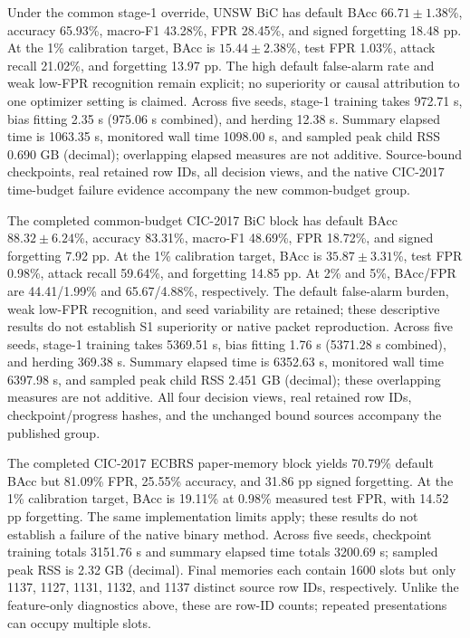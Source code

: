\documentclass[10pt,twocolumn]{article}
\begin{document}
Under the common stage-1 override, UNSW BiC has default BAcc $66.71\pm1.38$\%, accuracy 65.93\%, macro-F1 43.28\%, FPR 28.45\%, and signed forgetting 18.48 pp. At the 1\% calibration target, BAcc is $15.44\pm2.38$\%, test FPR 1.03\%, attack recall 21.02\%, and forgetting 13.97 pp. The high default false-alarm rate and weak low-FPR recognition remain explicit; no superiority or causal attribution to one optimizer setting is claimed. Across five seeds, stage-1 training takes 972.71 s, bias fitting 2.35 s (975.06 s combined), and herding 12.38 s. Summary elapsed time is 1063.35 s, monitored wall time 1098.00 s, and sampled peak child RSS 0.690 GB (decimal); overlapping elapsed measures are not additive. Source-bound checkpoints, real retained row IDs, all decision views, and the native CIC-2017 time-budget failure evidence accompany the new common-budget group.

The completed common-budget CIC-2017 BiC block has default BAcc $88.32\pm6.24$\%, accuracy 83.31\%, macro-F1 48.69\%, FPR 18.72\%, and signed forgetting 7.92 pp. At the 1\% calibration target, BAcc is $35.87\pm3.31$\%, test FPR 0.98\%, attack recall 59.64\%, and forgetting 14.85 pp. At 2\% and 5\%, BAcc/FPR are 44.41/1.99\% and 65.67/4.88\%, respectively. The default false-alarm burden, weak low-FPR recognition, and seed variability are retained; these descriptive results do not establish S1 superiority or native packet reproduction. Across five seeds, stage-1 training takes 5369.51 s, bias fitting 1.76 s (5371.28 s combined), and herding 369.38 s. Summary elapsed time is 6352.63 s, monitored wall time 6397.98 s, and sampled peak child RSS 2.451 GB (decimal); these overlapping measures are not additive. All four decision views, real retained row IDs, checkpoint/progress hashes, and the unchanged bound sources accompany the published group.

The completed CIC-2017 ECBRS paper-memory block yields 70.79\% default BAcc but 81.09\% FPR, 25.55\% accuracy, and 31.86 pp signed forgetting. At the 1\% calibration target, BAcc is 19.11\% at 0.98\% measured test FPR, with 14.52 pp forgetting. The same implementation limits apply; these results do not establish a failure of the native binary method. Across five seeds, checkpoint training totals 3151.76 s and summary elapsed time totals 3200.69 s; sampled peak RSS is 2.32 GB (decimal). Final memories each contain 1600 slots but only 1137, 1127, 1131, 1132, and 1137 distinct source row IDs, respectively. Unlike the feature-only diagnostics above, these are row-ID counts; repeated presentations can occupy multiple slots.
\end{document}
